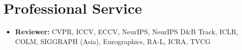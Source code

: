 \documentclass[letterpaper,11pt]{article}
\newlength{\gapItem}      \setlength{\gapItem}{-2pt}      %
\newlength{\gapList}      \setlength{\gapList}{-4pt}      %
\newcommand{\resumeItemListStart}{\begin{itemize}[leftmargin=0.15in]}
\newcommand{\resumeItemListEnd}{\end{itemize}\vspace{\gapList}}
\newcommand{\resumeItem}[1]{%
  \item\small{{#1 \vspace{\gapItem}}}
}
\begin{document}
\section{Professional Service}
\resumeItemListStart
    \resumeItem{\textbf{Reviewer:} CVPR, ICCV, ECCV, NeurIPS, NeurIPS D\&B Track, ICLR, COLM, SIGGRAPH (Asia), Eurographics, RA-L, ICRA, TVCG}
\resumeItemListEnd

\end{document}
